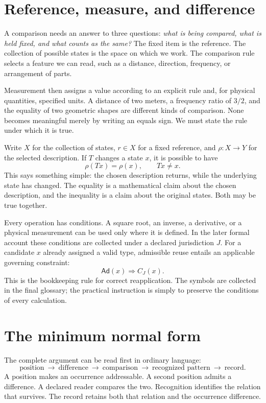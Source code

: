\documentclass[10pt]{article}
\begin{document}
\section{Reference, measure, and difference}\label{sec:ref}
A comparison needs an answer to three questions: \emph{what is being compared, what is held fixed, and what counts as the same?} The fixed item is the reference. The collection of possible states is the space on which we work. The comparison rule selects a feature we can read, such as a distance, direction, frequency, or arrangement of parts.

Measurement then assigns a value according to an explicit rule and, for physical quantities, specified units. A distance of two meters, a frequency ratio of $3/2$, and the equality of two geometric shapes are different kinds of comparison. None becomes meaningful merely by writing an equals sign. We must state the rule under which it is true.

Write $X$ for the collection of states, $r\in X$ for a fixed reference, and $\rho:X\to Y$ for the selected description. If $T$ changes a state $x$, it is possible to have
\begin{equation}\boxed{\rho(Tx)=\rho(x),\qquad Tx\ne x.}\label{eq:return}\end{equation}
This says something simple: the chosen description returns, while the underlying state has changed. The equality is a mathematical claim about the chosen description, and the inequality is a claim about the original states. Both may be true together.

Every operation has conditions. A square root, an inverse, a derivative, or a physical measurement can be used only where it is defined. In the later formal account these conditions are collected under a declared jurisdiction $J$. For a candidate $x$ already assigned a valid type, admissible reuse entails an applicable governing constraint:
\begin{equation}\boxed{\mathsf{Ad}(x)\Longrightarrow C_J(x).}\label{eq:ad}\end{equation}
This is the bookkeeping rule for correct reapplication. The symbols are collected in the final glossary; the practical instruction is simply to preserve the conditions of every calculation.



\section{The minimum normal form}
The complete argument can be read first in ordinary language:
\begin{equation}
\boxed{\text{position}\ \longrightarrow\ \text{difference}\ \longrightarrow\
\text{comparison}\ \longrightarrow\ \text{recognized pattern}\ \longrightarrow\ \text{record}.}
\end{equation}
A position makes an occurrence addressable. A second position admits a difference. A declared reader compares the two. Recognition identifies the relation that survives. The record retains both that relation and the occurrence difference.
\end{document}
